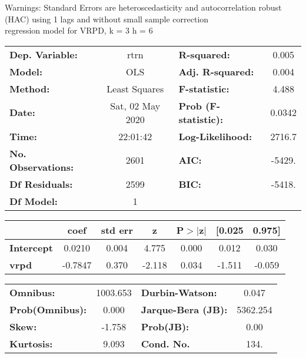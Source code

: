 Warnings: \newline
 [1] Standard Errors are heteroscedasticity and autocorrelation robust (HAC) using 1 lags and without small sample correction\\ 

regression model for VRPD, k = 3 h = 6\begin{center}
\begin{tabular}{lclc}
\toprule
\textbf{Dep. Variable:}    &       rtrn       & \textbf{  R-squared:         } &     0.005   \\
\textbf{Model:}            &       OLS        & \textbf{  Adj. R-squared:    } &     0.004   \\
\textbf{Method:}           &  Least Squares   & \textbf{  F-statistic:       } &     4.488   \\
\textbf{Date:}             & Sat, 02 May 2020 & \textbf{  Prob (F-statistic):} &   0.0342    \\
\textbf{Time:}             &     22:01:42     & \textbf{  Log-Likelihood:    } &    2716.7   \\
\textbf{No. Observations:} &        2601      & \textbf{  AIC:               } &    -5429.   \\
\textbf{Df Residuals:}     &        2599      & \textbf{  BIC:               } &    -5418.   \\
\textbf{Df Model:}         &           1      & \textbf{                     } &             \\
\bottomrule
\end{tabular}
\begin{tabular}{lcccccc}
                   & \textbf{coef} & \textbf{std err} & \textbf{z} & \textbf{P$> |$z$|$} & \textbf{[0.025} & \textbf{0.975]}  \\
\midrule
\textbf{Intercept} &       0.0210  &        0.004     &     4.775  &         0.000        &        0.012    &        0.030     \\
\textbf{vrpd}      &      -0.7847  &        0.370     &    -2.118  &         0.034        &       -1.511    &       -0.059     \\
\bottomrule
\end{tabular}
\begin{tabular}{lclc}
\textbf{Omnibus:}       & 1003.653 & \textbf{  Durbin-Watson:     } &    0.047  \\
\textbf{Prob(Omnibus):} &   0.000  & \textbf{  Jarque-Bera (JB):  } & 5362.254  \\
\textbf{Skew:}          &  -1.758  & \textbf{  Prob(JB):          } &     0.00  \\
\textbf{Kurtosis:}      &   9.093  & \textbf{  Cond. No.          } &     134.  \\
\bottomrule
\end{tabular}
\end{center}

